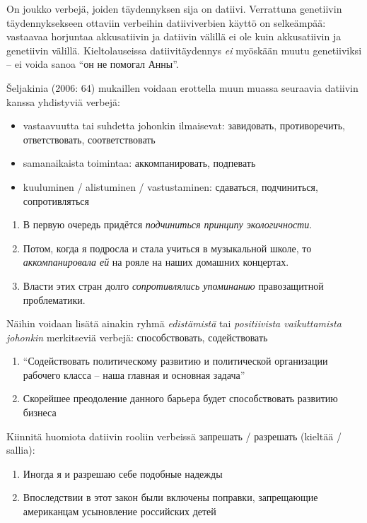 \documentclass[]{scrartcl}
\providecommand{\tightlist}{%
  \setlength{\itemsep}{0pt}\setlength{\parskip}{0pt}}
\begin{document}
On joukko verbejä, joiden täydennyksen sija on datiivi. Verrattuna
genetiivin täydennyksekseen ottaviin verbeihin datiiviverbien käyttö on
selkeämpää: vastaavaa horjuntaa akkusatiivin ja datiivin välillä ei ole
kuin akkusatiivin ja genetiivin välillä. Kieltolauseissa
datiivitäydennys \emph{ei} myöskään muutu genetiiviksi -- ei voida sanoa
``он не помогал Анны''.

Šeljakinia (2006: 64) mukaillen voidaan erottella muun muassa seuraavia
datiivin kanssa yhdistyviä verbejä:

\begin{itemize}
\tightlist
\item
  vastaavuutta tai suhdetta johonkin ilmaisevat: завидовать,
  противоречить, ответствовать, соответствовать
\item
  samanaikaista toimintaa: аккомпанировать, подпевать
\item
  kuuluminen / alistuminen / vastustaminen: сдаваться, подчиниться,
  сопротивляться
\end{itemize}

\begin{enumerate}
\def\labelenumi{(\arabic{enumi})}
\setcounter{enumi}{92}
\tightlist
\item
  В первую очередь придётся \emph{подчиниться принципу экологичности}.
\item
  Потом, когда я подросла и стала учиться в музыкальной школе, то
  \emph{аккомпанировала ей} на рояле на наших домашних концертах.
\item
  Власти этих стран долго \emph{сопротивлялись упоминанию} правозащитной
  проблематики.
\end{enumerate}

Näihin voidaan lisätä ainakin ryhmä \emph{edistämistä} tai
\emph{positiivista vaikuttamista johonkin} merkitseviä verbejä:
способствовать, содействовать

\begin{enumerate}
\def\labelenumi{(\arabic{enumi})}
\setcounter{enumi}{95}
\tightlist
\item
  ``Содействовать политическому развитию и политической организации
  рабочего класса -- наша главная и основная задача''
\item
  Скорейшее преодоление данного барьера будет способствовать развитию
  бизнеса
\end{enumerate}

Kiinnitä huomiota datiivin rooliin verbeissä запрешать / разрешать
(kieltää / sallia):

\begin{enumerate}
\def\labelenumi{(\arabic{enumi})}
\setcounter{enumi}{97}
\tightlist
\item
  Иногда я и разрешаю себе подобные надежды
\item
  Впоследствии в этот закон были включены поправки, запрещающие
  американцам усыновление российских детей
\end{enumerate}
\end{document}
